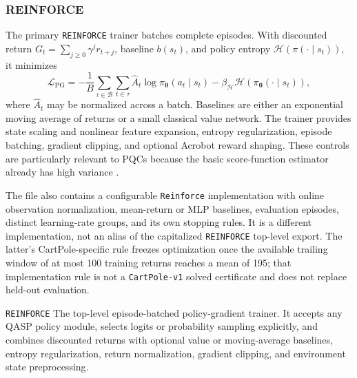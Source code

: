 \documentclass[10pt]{article}
\newcommand{\code}[1]{\texttt{#1}}
\newcommand{\Hc}{\mathcal{H}}
\begin{document}
\subsubsection{REINFORCE}

The primary \code{REINFORCE} trainer batches complete episodes.  With discounted return $G_t=\sum_{j\geq0}\gamma^jr_{t+j}$, baseline $b(s_t)$, and policy entropy $\Hc(\pi(\cdot\mid s_t))$, it minimizes
\begin{equation}
  \mathcal{L}_{\mathrm{PG}}
  =-\frac{1}{B}\sum_{\tau\in\mathcal{B}}\sum_{t\in\tau}
  \widehat{A}_t\log\pi_{\bm{\theta}}(a_t\mid s_t)
  -\beta_{\Hc}\Hc\!\left(\pi_{\bm{\theta}}(\cdot\mid s_t)\right),
  \label{eq:reinforce}
\end{equation}
where $\widehat{A}_t$ may be normalized across a batch.  Baselines are either an exponential moving average of returns or a small classical value network.  The trainer provides state scaling and nonlinear feature expansion, entropy regularization, episode batching, gradient clipping, and optional Acrobot reward shaping.  These controls are particularly relevant to PQCs because the basic score-function estimator already has high variance \cite{williams1992reinforce}.

The file also contains a configurable \code{Reinforce} implementation with
online observation normalization, mean-return or MLP baselines, evaluation
episodes, distinct learning-rate groups, and its own stopping rules.  It is a
different implementation, not an alias of the capitalized \code{REINFORCE}
top-level export.  The latter's CartPole-specific rule freezes optimization
once the available trailing window of at most 100 training returns reaches a
mean of 195; that implementation rule is not a \code{CartPole-v1} solved
certificate and does not replace held-out evaluation.

\begin{qaspfeature}{\code{REINFORCE}}
The top-level episode-batched policy-gradient trainer.  It accepts any QASP
policy module, selects logits or probability sampling explicitly, and combines
discounted returns with optional value or moving-average baselines, entropy
regularization, return normalization, gradient clipping, and environment
state preprocessing.
\end{qaspfeature}
\end{document}
